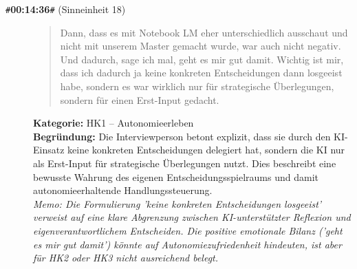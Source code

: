 \begin{description}
  \item[\texttt{\#}\textbf{00:14:36}\texttt{\#} (Sinneinheit 18)]
  \begin{quote}
  Dann, dass es mit Notebook LM eher unterschiedlich ausschaut und nicht mit unserem Master gemacht wurde, war auch nicht negativ. Und dadurch, sage ich mal, geht es mir gut damit. Wichtig ist mir, dass ich dadurch ja keine konkreten Entscheidungen dann losgeeist habe, sondern es war wirklich nur für strategische Überlegungen, sondern für einen Erst-Input gedacht.
  \end{quote}
  \textbf{Kategorie:} HK1 -- Autonomieerleben\\
  \textbf{Begr\"undung:} Die Interviewperson betont explizit, dass sie durch den KI-Einsatz keine konkreten Entscheidungen delegiert hat, sondern die KI nur als Erst-Input für strategische Überlegungen nutzt. Dies beschreibt eine bewusste Wahrung des eigenen Entscheidungsspielraums und damit autonomieerhaltende Handlungssteuerung.
  \\\textit{Memo: Die Formulierung 'keine konkreten Entscheidungen losgeeist' verweist auf eine klare Abgrenzung zwischen KI-unterstützter Reflexion und eigenverantwortlichem Entscheiden. Die positive emotionale Bilanz ('geht es mir gut damit') könnte auf Autonomiezufriedenheit hindeuten, ist aber für HK2 oder HK3 nicht ausreichend belegt.}
\end{description}
\medskip

